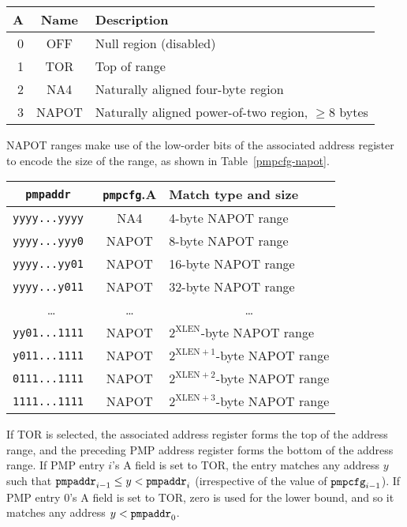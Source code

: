 \begin{table*}[h!]
\begin{center}
\begin{tabular}{|r|c|l|}
\hline
A & Name & Description \\
\hline
0 & OFF   & Null region (disabled) \\
1 & TOR   & Top of range \\
2 & NA4   & Naturally aligned four-byte region \\
3 & NAPOT & Naturally aligned power-of-two region, $\ge$8 bytes \\
\hline
\end{tabular}
\end{center}
\caption{Encoding of A field in PMP configuration registers.}
\label{pmpcfg-a}
\end{table*}

NAPOT ranges make use of the low-order bits of the associated address register
to encode the size of the range, as shown in Table~\ref{pmpcfg-napot}.

\begin{table*}[h!]
\begin{center}
  \begin{tabular}{|c|c|l|}
  \hline
  \tt pmpaddr    & {\tt pmpcfg}.A & Match type and size \\
  \hline
  \tt yyyy...yyyy & NA4   & 4-byte NAPOT range \\
  \tt yyyy...yyy0 & NAPOT & 8-byte NAPOT range \\
  \tt yyyy...yy01 & NAPOT & 16-byte NAPOT range \\
  \tt yyyy...y011 & NAPOT & 32-byte NAPOT range \\
  \multicolumn{1}{|c|}{\ldots} &  \ldots  & \multicolumn{1}{|c|}{\ldots} \\
  \tt yy01...1111 & NAPOT & $2^{\text{XLEN}}$-byte NAPOT range \\
  \tt y011...1111 & NAPOT & $2^{\text{XLEN}+1}$-byte NAPOT range \\
  \tt 0111...1111 & NAPOT & $2^{\text{XLEN}+2}$-byte NAPOT range \\
  \tt 1111...1111 & NAPOT & $2^{\text{XLEN}+3}$-byte NAPOT range \\
  \hline
  \end{tabular}
\end{center}
\caption{NAPOT range encoding in PMP address and configuration registers.}
\label{pmpcfg-napot}
\end{table*}

If TOR is selected, the associated address register forms the top of the
address range, and the preceding PMP address register forms the bottom of the
address range.  If PMP entry $i$'s A field is set to TOR, the entry matches
any address $y$ such that ${\tt pmpaddr}_{i-1}\leq y < {\tt pmpaddr}_i$
(irrespective of the value of ${\tt pmpcfg}_{i-1}$).
If
PMP entry 0's A field is set to TOR, zero is used for the lower bound, and so
it matches any address $y < {\tt pmpaddr}_0$.


